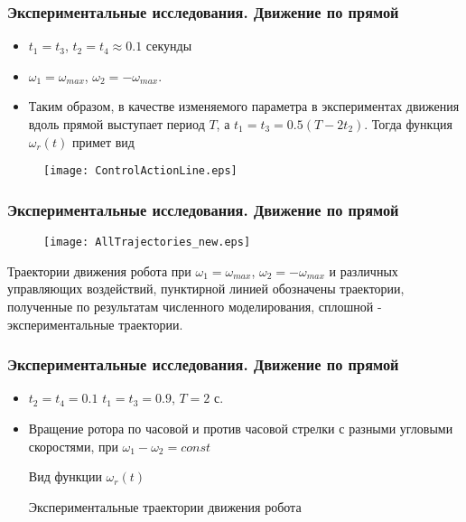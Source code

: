 \begin{frame}
\frametitle{Экспериментальные исследования. Движение по прямой}
\begin{itemize}
	\item $t_1=t_3$, $ t_2 = t_4 \approx 0.1 $ секунды
	\item $ \omega_1 = \omega_{max} $, $ \omega_2 = -\omega_{max} $. 
	\item Таким образом, в качестве изменяемого параметра в экспериментах движения вдоль прямой выступает период $ T $, а $t_1=t_3 = 0.5(T - 2t_2)$. 
	Тогда функция $ \omega_r(t) $ примет вид 


\end{itemize}
\begin{figure}[!ht]
	\centering
	\texttt{[image: ControlActionLine.eps]}
\end{figure}

\end{frame}


\begin{frame}
\frametitle{Экспериментальные исследования. Движение по прямой}
\begin{figure}[!ht]
	\centering
	\texttt{[image: AllTrajectories\_new.eps]}
\end{figure}

Траектории движения робота при  $ \omega_1 = \omega_{max} $, $ \omega_2 = -\omega_{max} $ и различных  управляющих воздействий, пунктирной линией обозначены траектории, полученные по результатам численного моделирования, сплошной - экспериментальные траектории.
\end{frame}


\begin{frame}
\frametitle{Экспериментальные исследования. Движение по прямой}
\begin{itemize}
	\item $ t_2=t_4=0.1 $ $ t_1=t_3=0.9 $, $T = 2$ с.
	\item Вращение ротора по часовой и против часовой стрелки с разными угловыми скоростями, при $ \omega_1 - \omega_2 = const$
	
	\begin{minipage}[h]{0.47\linewidth}
		Вид функции $ \omega_r(t) $ \\
	\end{minipage}
	\hfill
	\begin{minipage}[h]{0.47\linewidth}
		Экспериментальные траектории движения робота
	\end{minipage}
	
	
	
	
	
\end{itemize}


\end{frame}


